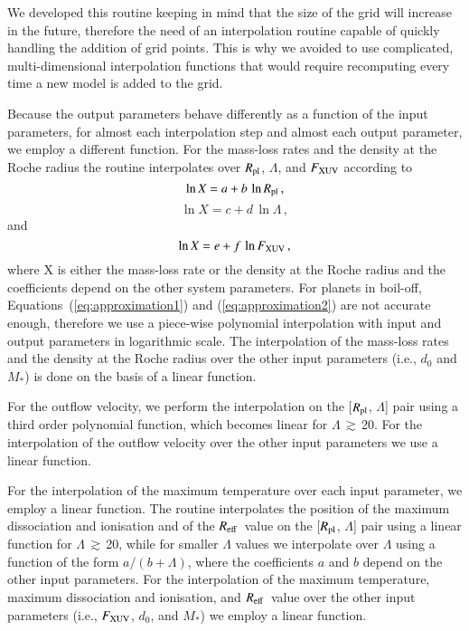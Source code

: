 \documentclass{aa}
\def\Reff{$R_{\rm eff}$}
\def\Rpl{$R_{\rm pl}$}
\begin{document}
{We developed this routine keeping in mind that the size of the
grid will increase in the future, therefore the need of an
interpolation routine capable of quickly handling the addition of
grid points. This is why we avoided to use complicated,
multi-dimensional interpolation functions that would require
recomputing every time a new model is added to the grid.}

{Because the output parameters behave differently as a function of
the input parameters, for almost each interpolation step and
almost each output parameter, we employ a different function. For
the mass-loss rates and the density at the Roche radius the
routine interpolates over \Rpl, $\Lambda$, and $F_{\rm XUV}$
according to}
%
\begin{equation}
\label{eq:approximation1}
\ln{X} = a + b\,\ln{R_{\rm pl}}\,,
\end{equation}
%
%
\begin{equation}
\label{eq:approximation2}
\ln{X} = c + d\,\ln{\Lambda}\,,
\end{equation}
%
and
%
\begin{equation}
\label{eq:approximation3}
\ln{X} = e + f\,\ln{F_{\rm XUV}}\,,
\end{equation}
%
{where X is either the mass-loss rate or the density at the Roche
radius and the coefficients depend on the other system parameters.
For planets in boil-off, Equations~(\ref{eq:approximation1}) and
(\ref{eq:approximation2}) are not accurate enough, therefore we
use a piece-wise polynomial interpolation with input and output
parameters in logarithmic scale. The interpolation of the
mass-loss rates and the density at the Roche radius over the other
input parameters (i.e., $d_0$ and $M_*$) is done on the basis of a
linear function.}

{For the outflow velocity, we perform the interpolation on the
[\Rpl, $\Lambda$] pair using a third order polynomial function,
which becomes linear for $\Lambda$\,$\gtrsim$\,20. For the
interpolation of the outflow velocity over the other input
parameters we use a linear function.}

{For the interpolation of the maximum temperature over each input
parameter, we employ a linear function. The routine interpolates
the position of the maximum dissociation and ionisation and of the
\Reff\ value on the [\Rpl, $\Lambda$] pair using a linear function
for $\Lambda$\,$\gtrsim$\,20, while for smaller $\Lambda$ values
we interpolate over $\Lambda$ using a function of the form $a / (b
+ \Lambda)$, where the coefficients $a$ and $b$ depend on the
other input parameters. For the interpolation of the maximum
temperature, maximum dissociation and ionisation, and \Reff\ value
over the other input parameters (i.e., $F_{\rm XUV}$, $d_0$, and
$M_*$) we employ a linear function.}
\end{document}
